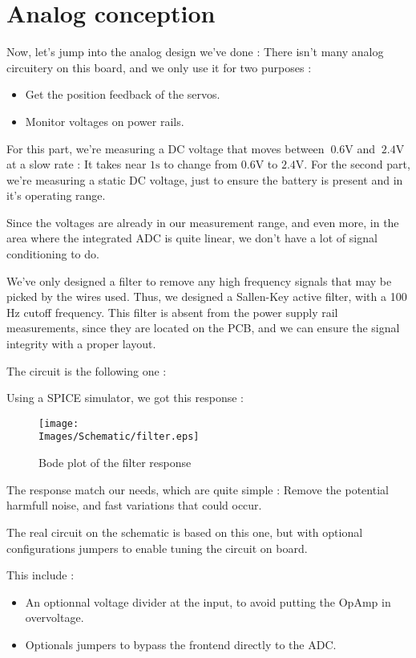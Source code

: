 \section{Analog conception}
Now, let's jump into the analog design we've done : There isn't many analog
circuitery on this board, and we only use it for two purposes :

\begin{itemize}[noitemsep]
    \item   Get the position feedback of the servos.
    \item   Monitor voltages on power rails.
\end{itemize}

For this part, we're measuring a DC voltage that moves between $~0.6
    \si{\volt}$ and $~2.4 \si{\volt}$ at a slow rate : It takes near $1
    \si{\second}$ to change from $0.6 \si{\volt}$ to $2.4 \si{\volt}$. For the
second part, we're measuring a static DC voltage, just to ensure the battery is
present and in it's operating range.

Since the voltages are already in our measurement range, and even more, in the
area where the integrated ADC is quite linear, we don't have a lot of signal
conditioning to do.

We've only designed a filter to remove any high frequency signals that may be
picked by the wires used. Thus, we designed a Sallen-Key active filter, with a
100 Hz cutoff frequency. This filter is absent from the power supply rail
measurements, since they are located on the PCB, and we can ensure the signal
integrity with a proper layout.

The circuit is the following one : 

Using a SPICE simulator, we got this response :
\begin{figure}[!hbt]
    \centering
    \texttt{[image: \\Images/Schematic/filter.eps]}
    \caption{Bode plot of the filter response}
\end{figure}
\FloatBarrier

The response match our needs, which are quite simple : Remove the potential
harmfull noise, and fast variations that could occur.

The real circuit on the schematic is based on this one, but with optional
configurations jumpers to enable tuning the circuit on board.

This include :
\begin{itemize}[noitemsep]
    \item   An optionnal voltage divider at the input, to avoid putting the OpAmp in
          overvoltage.
    \item   Optionals jumpers to bypass the frontend directly to the ADC.
\end{itemize}